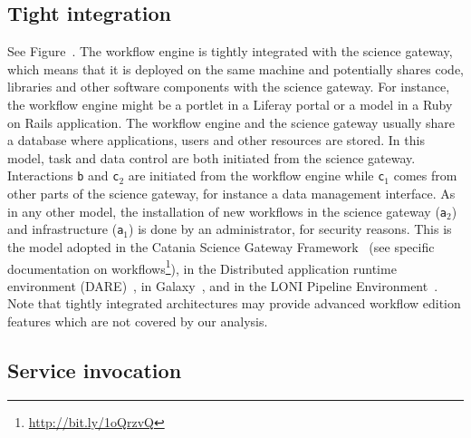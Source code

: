 \documentclass[preprint,3p,twocolumn]{elsarticle}
\newcommand{\note}[2]{\pdfmargincomment[color=yellow,author=#1,open=true]{#2}}
\newcommand{\closednote}[4]{} %
\begin{document}
\subsection{Tight integration}

See Figure~. The workflow engine is tightly
integrated with the science gateway, which means that it is deployed
on the same machine and potentially shares code, libraries and other
software components with the science gateway. For instance, the
workflow engine might be a portlet in a Liferay portal or a model
in a Ruby on Rails application. The workflow engine and the science
gateway usually share a database where applications, users and other
resources are stored\closednote{sorina}{VIP and Moteur also share the
  WorkflowsDB}{Tristan}{Yes, you are right. This is an example where
  such abstract architectures may not completely apply in real
  life. See comment about ``blended'' architectures in the
  discussion. In case of VIP, the sharing of the DB is more an
  implementation detail rather than a strong architectural pattern: we
  could avoid sharing the DB if we wanted.}.  In this model, task and
data control are both initiated from the science gateway. Interactions
\texttt{b} and \texttt{c$_2$} are initiated from the workflow engine
while \texttt{c$_1$} comes from other parts of the science gateway,
for instance a data management interface. As in any other model, the
installation of new workflows in the science gateway (\texttt{a$_2$})
and infrastructure (\texttt{a$_1$}) is done by an administrator, for
security reasons. This is the model adopted in the Catania Science
Gateway Framework~\cite{ardizzone2012decide} (see specific documentation on
workflows\footnote{\url{http://bit.ly/1oQrzvQ}}), in the Distributed
application runtime environment
(DARE)~\cite{maddineni2012distributed}, in
Galaxy~\cite{goecks2010galaxy}, and in the LONI Pipeline
Environment~\cite{dinov2009efficient}. Note that tightly integrated
architectures may provide advanced workflow edition features which are
not covered by our analysis.

\subsection{Service invocation}
\end{document}
